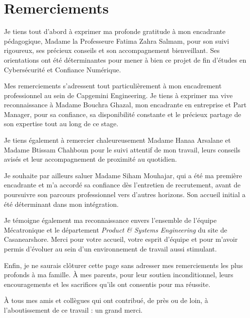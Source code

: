 \documentclass[a4paper, 12pt]{report}
\begin{document}
\chapter*{Remerciements}

Je tiens tout d'abord à exprimer ma profonde gratitude à mon encadrante pédagogique, Madame la Professeure Fatima Zahra Salmam, pour son suivi rigoureux, ses précieux conseils et son accompagnement bienveillant. Ses orientations ont été déterminantes pour mener à bien ce projet de fin d'études en Cybersécurité et Confiance Numérique.

Mes remerciements s'adressent tout particulièrement à mon encadrement professionnel au sein de Capgemini Engineering. Je tiens à exprimer ma vive reconnaissance à Madame Bouchra Ghazal, mon encadrante en entreprise et Part Manager, pour sa confiance, sa disponibilité constante et le précieux partage de son expertise tout au long de ce stage. 

Je tiens également à remercier chaleureusement Madame Hanaa Arsalane et Madame Btissam Chahboun pour le suivi attentif de mon travail, leurs conseils avisés et leur accompagnement de proximité au quotidien.

Je souhaite par ailleurs saluer Madame Siham Mouhajar, qui a été ma première encadrante et m'a accordé sa confiance dès l'entretien de recrutement, avant de poursuivre son parcours professionnel vers d'autres horizons. Son accueil initial a été déterminant dans mon intégration.

Je témoigne également ma reconnaissance envers l'ensemble de l'équipe Mécatronique et le département \textit{Product \& Systems Engineering} du site de Casanearshore. Merci pour votre accueil, votre esprit d'équipe et pour m'avoir permis d'évoluer au sein d'un environnement de travail aussi stimulant.

Enfin, je ne saurais clôturer cette page sans adresser mes remerciements les plus profonds à ma famille. À mes parents, pour leur soutien inconditionnel, leurs encouragements et les sacrifices qu'ils ont consentis pour ma réussite. 

À tous mes amis et collègues qui ont contribué, de près ou de loin, à l'aboutissement de ce travail : un grand merci.

\newpage
\thispagestyle{empty}
\end{document}
